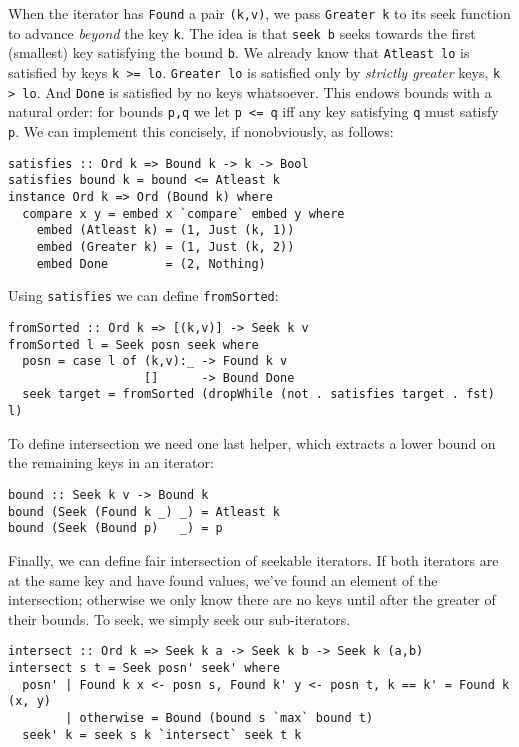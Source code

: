 \documentclass[acmsmall,screen,review,anonymous,dvipsnames,svgnames]{acmart}
\newcommand\hask[1]{\texttt{#1}}
\newcommand\ttt\texttt
\newcommand\todo[1]{{\color{Orange}#1}}
\renewcommand\todo[1]{{\color{IndianRed}#1}}
\renewcommand\todo[1]{\ignorespaces}
\begin{document}
\noindent
\todo{TODO: also need to explain the \hask{Bound k} case where we retry!}
When the iterator has \hask{Found} a pair \ttt{(k,v)}, we pass \hask{Greater k} to its seek function to advance \emph{beyond} the key \ttt{k}.
The idea is that \ttt{seek b} seeks towards the first (smallest) key satisfying the bound \ttt{b}.
We already know that \hask{Atleast lo} is satisfied by keys \ttt{k >= lo}.
\hask{Greater lo} is satisfied only by \emph{strictly greater} keys, \ttt{k > lo}.
And \hask{Done} is satisfied by no keys whatsoever.
This endows bounds with a natural order: for bounds \ttt{p,q} we let \ttt{p <= q} iff any key satisfying \ttt{q} must satisfy \ttt{p}.
We can implement this concisely, if nonobviously, as follows:

\begin{verbatim}
satisfies :: Ord k => Bound k -> k -> Bool
satisfies bound k = bound <= Atleast k
instance Ord k => Ord (Bound k) where
  compare x y = embed x `compare` embed y where
    embed (Atleast k) = (1, Just (k, 1))
    embed (Greater k) = (1, Just (k, 2))
    embed Done        = (2, Nothing)
\end{verbatim}

\noindent
Using \ttt{satisfies} we can define \ttt{fromSorted}:

\begin{verbatim}
fromSorted :: Ord k => [(k,v)] -> Seek k v
fromSorted l = Seek posn seek where
  posn = case l of (k,v):_ -> Found k v
                   []      -> Bound Done
  seek target = fromSorted (dropWhile (not . satisfies target . fst) l)
\end{verbatim}

\noindent
To define intersection we need one last helper, which extracts a lower bound on the remaining keys in an iterator:

\begin{verbatim}
bound :: Seek k v -> Bound k
bound (Seek (Found k _) _) = Atleast k
bound (Seek (Bound p)   _) = p
\end{verbatim}

\noindent
Finally, we can define fair intersection of seekable iterators.
If both iterators are at the same key and have found values, we've found an element of the intersection; otherwise we only know there are no keys until after the greater of their bounds.
To seek, we simply seek our sub-iterators.
\todo{Point out that this \emph{bounds} the work done by a single call to seek.}

\begin{verbatim}
intersect :: Ord k => Seek k a -> Seek k b -> Seek k (a,b)
intersect s t = Seek posn' seek' where
  posn' | Found k x <- posn s, Found k' y <- posn t, k == k' = Found k (x, y)
        | otherwise = Bound (bound s `max` bound t)
  seek' k = seek s k `intersect` seek t k
\end{verbatim}
\end{document}
